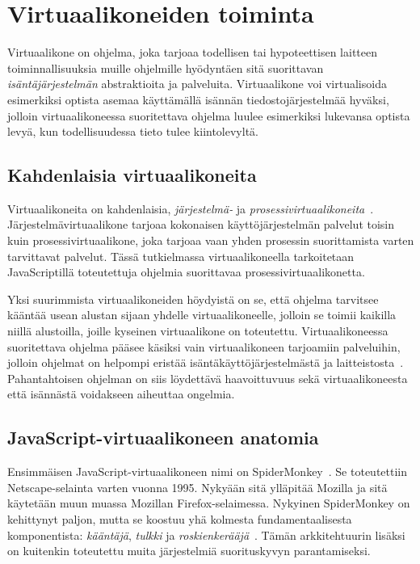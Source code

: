 \section{Virtuaalikoneiden toiminta}

Virtuaalikone on ohjelma, joka tarjoaa todellisen tai hypoteettisen laitteen toiminnallisuuksia muille ohjelmille hyödyntäen sitä suorittavan \textit{isäntäjärjestelmän} abstraktioita ja palveluita. Virtuaalikone voi virtualisoida esimerkiksi optista asemaa käyttämällä isännän tiedostojärjestelmää hyväksi, jolloin virtuaalikoneessa suoritettava ohjelma luulee esimerkiksi lukevansa optista levyä, kun todellisuudessa tieto tulee kiintolevyltä.

\subsection{Kahdenlaisia virtuaalikoneita}

Virtuaalikoneita on kahdenlaisia, \textit{järjestelmä-} ja \textit{prosessivirtuaalikoneita}~\cite[s.~33]{vms}. Järjestelmävirtuaalikone tarjoaa kokonaisen käyttöjärjestelmän palvelut toisin kuin prosessivirtuaalikone, joka tarjoaa vaan yhden prosessin suorittamista varten tarvittavat palvelut. Tässä tutkielmassa virtuaalikoneella tarkoitetaan JavaScriptillä toteutettuja ohjelmia suorittavaa prosessivirtuaalikonetta.

Yksi suurimmista virtuaalikoneiden höydyistä on se, että ohjelma tarvitsee kääntää usean alustan sijaan yhdelle virtuaalikoneelle, jolloin se toimii kaikilla niillä alustoilla, joille kyseinen virtuaalikone on toteutettu. Virtuaalikoneessa suoritettava ohjelma pääsee käsiksi vain virtuaalikoneen tarjoamiin palveluihin, jolloin ohjelmat on helpompi eristää isäntäkäyttöjärjestelmästä ja laitteistosta~\cite[s.~36]{vms}. Pahantahtoisen ohjelman on siis löydettävä haavoittuvuus sekä virtuaalikoneesta että isännästä voidakseen aiheuttaa ongelmia.

\subsection{JavaScript-virtuaalikoneen anatomia}

Ensimmäisen JavaScript-virtuaalikoneen nimi on SpiderMonkey~\cite{spidermonkey}. Se toteutettiin Netscape-selainta varten vuonna 1995. Nykyään sitä ylläpitää Mozilla ja sitä käytetään muun muassa Mozillan Firefox-selaimessa. Nykyinen SpiderMonkey on kehittynyt paljon, mutta se koostuu yhä kolmesta fundamentaalisesta komponentista: \textit{kääntäjä}, \textit{tulkki} ja \textit{roskienkerääjä}~\cite{spidermonkeydesign}. Tämän arkkitehtuurin lisäksi on kuitenkin toteutettu muita järjestelmiä suorituskyvyn parantamiseksi.

